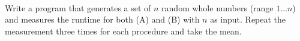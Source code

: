  \\
Write a program that generates a set of $n$ random whole numbers
(range $1 \dots n$) and measures the runtime for both (A) and (B) with $n$
as input.
Repeat the measurement three times for each procedure and take the mean.